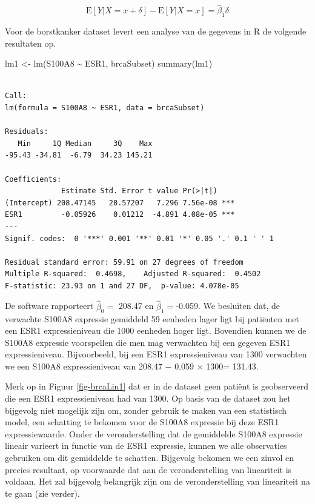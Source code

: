 \documentclass[
  dutch,
  letterpaper,
  12pt]{book}
\newenvironment{Shaded}{\begin{snugshade}}{\end{snugshade}}
\newcommand{\FunctionTok}[1]{\textcolor[rgb]{0.28,0.35,0.67}{#1}}
\newcommand{\NormalTok}[1]{\textcolor[rgb]{0.00,0.23,0.31}{#1}}
\newcommand{\OtherTok}[1]{\textcolor[rgb]{0.00,0.23,0.31}{#1}}
\newcommand{\SpecialCharTok}[1]{\textcolor[rgb]{0.37,0.37,0.37}{#1}}
\theoremstyle{definition}
\theoremstyle{definition}
\theoremstyle{definition}
\theoremstyle{remark}
\begin{document}
\[\text{E}\left[Y|X=x+\delta\right]-\text{E}\left[Y|X=x\right]= \hat{\beta}_1\delta\]

Voor de borstkanker dataset levert een analyse van de gegevens in R de
volgende resultaten op.

\begin{Shaded}
\begin{Highlighting}[]
\NormalTok{lm1 }\OtherTok{\textless{}{-}} \FunctionTok{lm}\NormalTok{(S100A8 }\SpecialCharTok{\textasciitilde{}}\NormalTok{ ESR1, brcaSubset)}
\FunctionTok{summary}\NormalTok{(lm1)}
\end{Highlighting}
\end{Shaded}

\begin{verbatim}

Call:
lm(formula = S100A8 ~ ESR1, data = brcaSubset)

Residuals:
   Min     1Q Median     3Q    Max 
-95.43 -34.81  -6.79  34.23 145.21 

Coefficients:
             Estimate Std. Error t value Pr(>|t|)    
(Intercept) 208.47145   28.57207   7.296 7.56e-08 ***
ESR1         -0.05926    0.01212  -4.891 4.08e-05 ***
---
Signif. codes:  0 '***' 0.001 '**' 0.01 '*' 0.05 '.' 0.1 ' ' 1

Residual standard error: 59.91 on 27 degrees of freedom
Multiple R-squared:  0.4698,    Adjusted R-squared:  0.4502 
F-statistic: 23.93 on 1 and 27 DF,  p-value: 4.078e-05
\end{verbatim}

De software rapporteert \(\hat{\beta}_0=\) 208.47 en
\(\hat{\beta}_1=\)-0.059. We besluiten dat, de verwachte S100A8
expressie gemiddeld 59 eenheden lager ligt bij patiënten met een ESR1
expressieniveau die 1000 eenheden hoger ligt. Bovendien kunnen we de
S100A8 expressie voorspellen die men mag verwachten bij een gegeven ESR1
expressieniveau. Bijvoorbeeld, bij een ESR1 expressieniveau van 1300
verwachten we een S100A8 expressieniveau van 208.47 \(-\) 0.059
\(\times\) 1300= 131.43.

Merk op in Figuur \ref{fig-brcaLin1} dat er in de dataset geen patiënt
is geobserveerd die een ESR1 expressieniveau had van 1300. Op basis van
de dataset zou het bijgevolg niet mogelijk zijn om, zonder gebruik te
maken van een statistisch model, een schatting te bekomen voor de S100A8
expressie bij deze ESR1 expressiewaarde. Onder de veronderstelling dat
de gemiddelde S100A8 expressie lineair varieert in functie van de ESR1
expressie, kunnen we alle observaties gebruiken om dit gemiddelde te
schatten. Bijgevolg bekomen we een zinvol en precies resultaat, op
voorwaarde dat aan de veronderstelling van lineariteit is voldaan. Het
zal bijgevolg belangrijk zijn om de veronderstelling van lineariteit na
te gaan (zie verder).
\end{document}

